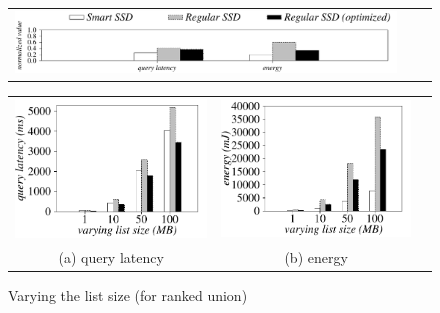   \begin{figure}[htbp]
  \centering
    \begin{tabular}{ccc}
 \includegraphics[width=0.95\columnwidth]{figures/banner.pdf}
\end{tabular}
\renewcommand{\tabcolsep}{0.1mm}
  \begin{tabular}{ccc}
 \includegraphics[width=0.5\columnwidth]{figures/RankUnion-time-VaryListLen-eps-converted-to.pdf}&
  \includegraphics[width=0.5\columnwidth]{figures/RankUnion-energy-VaryListLen-eps-converted-to.pdf}\\
  (a) query latency & (b) energy
\end{tabular}
  \caption{Varying the list size (for ranked union)}
  \label{fig:varyListLenRankUnion}
 \end{figure}

